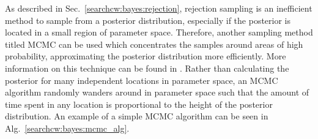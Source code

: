 As described in Sec.~\ref{searchcw:bayes:rejection}, rejection sampling is an inefficient method to sample from a posterior distribution, especially if the posterior is located in a small region of parameter space.
Therefore, another sampling method titled \gls{MCMC} can be used which concentrates the samples around areas of high probability,
approximating the posterior distribution more efficiently. More information on
this technique can be found in
\citep{metropolis1953EquationState,vanravenzwaaij2018SimpleIntroduction,sharma2017MarkovChain}.
Rather than calculating the posterior for many independent locations in
parameter space, an \gls{MCMC} algorithm randomly wanders around in parameter
space such that the amount of time spent in any location is proportional to the
height of the posterior distribution.  An example of a simple \gls{MCMC} algorithm can be
seen in Alg.~\ref{searchcw:bayes:mcmc_alg}.

